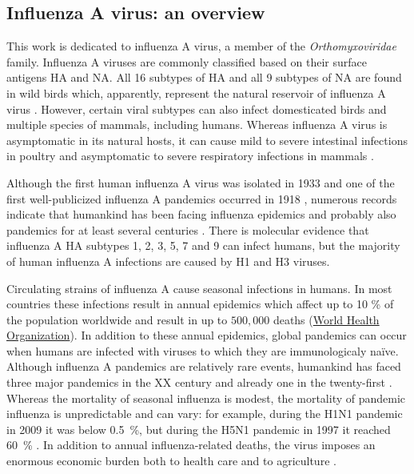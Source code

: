 \subsection{Influenza A virus: an overview}
	
	This work is dedicated to influenza A virus, a member of the \textit{Orthomyxoviridae} family. Influenza A viruses are commonly classified based on their surface antigens \gls{HA} and \gls{NA}. All 16 subtypes of \gls{HA} and all 9 subtypes of \gls{NA} are found in wild birds which, apparently, represent the natural reservoir of influenza A virus \parencite{Stallknecht2007}. However, certain viral subtypes can also infect domesticated birds and multiple species of mammals, including humans. Whereas influenza A virus is asymptomatic in its natural hosts, it can cause mild to severe intestinal infections in poultry and asymptomatic to severe respiratory infections in mammals \parencite{Webster1992a}. 
	
	Although the first human influenza A virus was isolated in 1933 \parencite{Smith1933} and one of the first well-publicized influenza A pandemics occurred in 1918 \parencite{Taubenberger1997}, numerous records indicate that humankind has been facing influenza epidemics and probably also pandemics for at least several centuries \parencite{Potter2001}. There is molecular evidence that influenza A \gls{HA} subtypes 1, 2, 3, 5, 7 and 9 can infect humans, but the  majority of human influenza A infections are caused by H1 and H3 viruses.
	
	Circulating strains of influenza A cause seasonal infections in humans. In most countries these infections result in annual epidemics which affect up to 10 \% of the population worldwide and result in up to $500,000$ deaths (\hyperlink{www.who.in}{World Health Organization}). In addition to these annual epidemics, global pandemics can occur when humans are infected with viruses to which they are immunologicaly na\"{i}ve. Although influenza A pandemics are relatively rare events, humankind has faced three major pandemics in the XX century and already one in the twenty-first \parencite{Lagace-Wiens2010, Fineberg2014}.  Whereas the mortality of seasonal influenza is modest, the mortality of pandemic influenza is unpredictable and can vary: for example, during the H1N1 pandemic in 2009 it was below 0.5~\%, but during the H5N1 pandemic in 1997 it reached 60~\% \parencite{Forrest2010, Noah2013}. In addition to annual influenza-related deaths, the virus imposes an enormous economic burden both to health care and to agriculture \parencite{Szucs1999, Noah2013}. 
	
